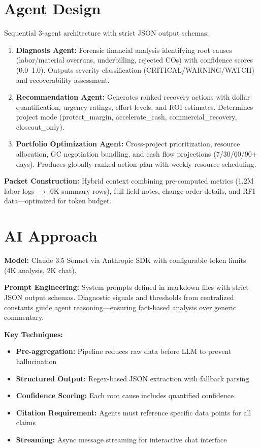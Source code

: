 \documentclass[11pt,a4paper]{article}
\begin{document}
\section{Agent Design}

Sequential 3-agent architecture with strict JSON output schemas:

\begin{enumerate}
    \item \textbf{Diagnosis Agent:} Forensic financial analysis identifying root causes (labor/material overruns, underbilling, rejected COs) with confidence scores (0.0--1.0). Outputs severity classification (CRITICAL/WARNING/WATCH) and recoverability assessment.

    \item \textbf{Recommendation Agent:} Generates ranked recovery actions with dollar quantification, urgency ratings, effort levels, and ROI estimates. Determines project mode (protect\_margin, accelerate\_cash, commercial\_recovery, closeout\_only).

    \item \textbf{Portfolio Optimization Agent:} Cross-project prioritization, resource allocation, GC negotiation bundling, and cash flow projections (7/30/60/90+ days). Produces globally-ranked action plan with weekly resource scheduling.
\end{enumerate}

\textbf{Packet Construction:} Hybrid context combining pre-computed metrics (1.2M labor logs $\rightarrow$ 6K summary rows), full field notes, change order details, and RFI data---optimized for token budget.

\section{AI Approach}

\textbf{Model:} Claude 3.5 Sonnet via Anthropic SDK with configurable token limits (4K analysis, 2K chat).

\textbf{Prompt Engineering:} System prompts defined in markdown files with strict JSON output schemas. Diagnostic signals and thresholds from centralized constants guide agent reasoning---ensuring fact-based analysis over generic commentary.

\textbf{Key Techniques:}
\begin{itemize}
    \item \textbf{Pre-aggregation:} Pipeline reduces raw data before LLM to prevent hallucination
    \item \textbf{Structured Output:} Regex-based JSON extraction with fallback parsing
    \item \textbf{Confidence Scoring:} Each root cause includes quantified confidence
    \item \textbf{Citation Requirement:} Agents must reference specific data points for all claims
    \item \textbf{Streaming:} Async message streaming for interactive chat interface
\end{itemize}
\end{document}

